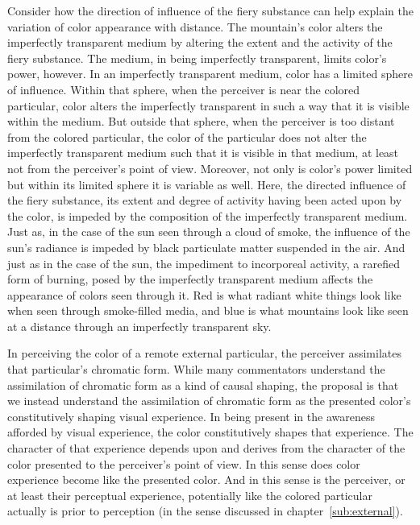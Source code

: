Consider how the direction of influence of the fiery substance can help explain the variation of color appearance with distance. The mountain's color alters the imperfectly transparent medium by altering the extent and the activity of the fiery substance. The medium, in being imperfectly transparent, limits color's power, however. In an imperfectly transparent medium, color has a limited sphere of influence. Within that sphere, when the perceiver is near the colored particular, color alters the imperfectly transparent in such a way that it is visible within the medium. But outside that sphere, when the perceiver is too distant from the colored particular, the color of the particular does not alter the imperfectly transparent medium such that it is visible in that medium, at least not from the perceiver's point of view. Moreover, not only is color's power limited but within its limited sphere it is variable as well. Here, the directed influence of the fiery substance, its extent and degree of activity having been acted upon by the color, is impeded by the composition of the imperfectly transparent medium. Just as, in the case of the sun seen through a cloud of smoke, the influence of the sun's radiance is impeded by black particulate matter suspended in the air. And just as in the case of the sun, the impediment to incorporeal activity, a rarefied form of burning, posed by the imperfectly transparent medium affects the appearance of colors seen through it. Red is what radiant white things look like when seen through smoke-filled media, and blue is what mountains look like seen at a distance through an imperfectly transparent sky.

In perceiving the color of a remote external particular, the perceiver assimilates that particular's chromatic form. While many commentators understand the assimilation of chromatic form as a kind of causal shaping, the proposal is that we instead understand the assimilation of chromatic form as the presented color's constitutively shaping visual experience. In being present in the awareness afforded by visual experience, the color constitutively shapes that experience. The character of that experience depends upon and derives from the character of the color presented to the perceiver's point of view. In this sense does color experience become like the presented color. And in this sense is the perceiver, or at least their perceptual experience, potentially like the colored particular actually is prior to perception (in the sense discussed in chapter~\ref{sub:external}).

